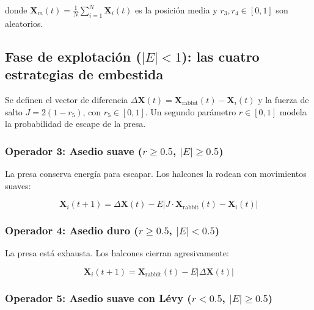 \documentclass[12pt,letterpaper]{article}
\begin{document}
donde $\mathbf{X}_m(t) = \frac{1}{N}\sum_{i=1}^{N} \mathbf{X}_i(t)$ es la posición media y $r_3, r_4 \in [0,1]$ son aleatorios.

\subsection{Fase de explotación (\texorpdfstring{$|E| < 1$}{|E|<1}): las cuatro estrategias de embestida}

Se definen el vector de diferencia $\Delta \mathbf{X}(t) = \mathbf{X}_{\text{rabbit}}(t) - \mathbf{X}_i(t)$ y la fuerza de salto $J = 2(1 - r_5)$, con $r_5 \in [0,1]$. Un segundo parámetro $r \in [0,1]$ modela la probabilidad de escape de la presa.

\subsubsection{Operador 3: Asedio suave (\texorpdfstring{$r \geq 0.5$, $|E| \geq 0.5$}{r>=0.5, |E|>=0.5})}

La presa conserva energía para escapar. Los halcones la rodean con movimientos suaves:

\begin{formulabox}
\begin{equation}
\mathbf{X}_i(t+1) = \Delta \mathbf{X}(t) - E \left| J \cdot \mathbf{X}_{\text{rabbit}}(t) - \mathbf{X}_i(t) \right|
\label{eq:soft_besiege}
\end{equation}
\end{formulabox}

\subsubsection{Operador 4: Asedio duro (\texorpdfstring{$r \geq 0.5$, $|E| < 0.5$}{r>=0.5, |E|<0.5})}

La presa está exhausta. Los halcones cierran agresivamente:

\begin{formulabox}
\begin{equation}
\mathbf{X}_i(t+1) = \mathbf{X}_{\text{rabbit}}(t) - E \left| \Delta \mathbf{X}(t) \right|
\label{eq:hard_besiege}
\end{equation}
\end{formulabox}

\subsubsection{Operador 5: Asedio suave con Lévy (\texorpdfstring{$r < 0.5$, $|E| \geq 0.5$}{r<0.5, |E|>=0.5})}
\end{document}
